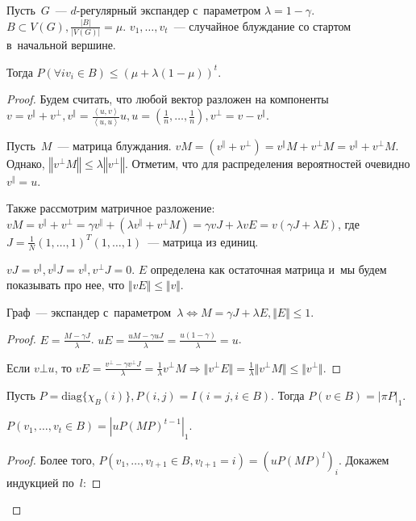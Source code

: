 \documentclass{article}
\begin{document}
\begin{theorem}
	Пусть~$G$~--- $d$-регулярный экспандер с~параметром $\lambda = 1 - \gamma$. $B
	\subset V(G), \frac{|B|}{|V(G)|} = \mu$. $v_1, \ldots, v_t$~--- случайное
	блуждание со стартом в~начальной вершине.

	Тогда $P(\forall i v_i \in B) \le (\mu + \lambda(1 - \mu))^t$.
\end{theorem}
\begin{proof}
	Будем считать, что любой вектор разложен на компоненты $v = v^\Vert + v^\bot,
	v^\Vert = \frac{\left<u, v\right>}{\left<u, u\right>}u, u = (\frac{1}{n},
	\ldots, \frac{1}{n}), v^\bot = v - v^\Vert$.

	Пусть~$M$~--- матрица блуждания. $vM = (v^\Vert + v^\bot) = v^\Vert M + v^\bot
	M = v^\Vert + v^\bot M$. Однако, $\left\Vert v^\bot M \right\Vert \le \lambda
	\left\Vert v^\bot \right\Vert$. Отметим, что для распределения вероятностей
	очевидно $v^\Vert = u$.

	Также рассмотрим матричное разложение: $vM = v^\Vert + v^\bot = \gamma v^\Vert
	+ (\lambda v^\Vert + v^\bot M) = \gamma v J + \lambda v E = v(\gamma J +
	\lambda E)$, где $J = \frac{1}{N} (1, \ldots, 1)^T (1, \ldots, 1)$~--- матрица
	из единиц.

	$vJ = v^\Vert, v^\Vert J = v^\Vert, v^\bot J = 0$. $E$ определена как
	остаточная матрица и~мы будем показывать про нее, что $\Vert vE \Vert \le
	\Vert v \Vert$.

	\begin{claim}
		Граф~--- экспандер с~параметром~$\lambda \Leftrightarrow M = \gamma J +
		\lambda E, \Vert E \Vert \le 1$.
	\end{claim}
	\begin{proof}
		$E = \frac{M - \gamma J}{\lambda}$. $uE = \frac{uM - \gamma uJ}{\lambda} =
		\frac{u(1 - \gamma)}{\lambda} = u$.

		Если $v \bot u$, то $vE = \frac{v^\bot - \gamma v^\bot J}{\lambda} =
		\frac{1}{\lambda} v^\bot M \Rightarrow \Vert v^\bot E \Vert =
		\frac{1}{\lambda} \Vert v^\bot M \Vert \le \Vert v^\bot \Vert$.
	\end{proof}

	Пусть $P = \text{diag}\{ \chi_B(i) \}, P(i, j) = I(i = j, i \in B)$. Тогда
	$P(v \in B) = |\pi P|_1$.

	\begin{claim}
		$P(v_1, \ldots, v_t \in B) = |u P(MP)^{t-1}|_1$.
	\end{claim}
	\begin{proof}
		Более того, $P(v_1, \ldots, v_{l+1} \in B, v_{l + 1} = i) =
		(uP(MP)^{l})_i$. Докажем индукцией по~$l$:


\end{proof}
\end{proof}
\end{document}
